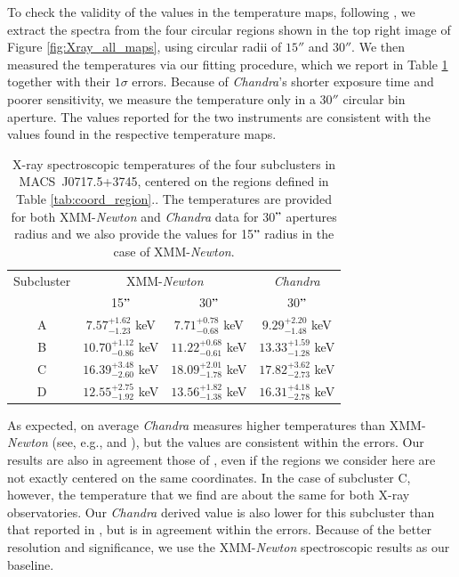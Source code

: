 \documentclass[twocolumn,traditabstract]{aa}
\begin{document}
To check the validity of the values in the temperature maps, following \cite{wang2016}, we extract the spectra from the four circular regions shown in the top right image of Figure  \ref{fig:Xray_all_maps}, using circular radii of $15''$ and $30''$. We then measured the temperatures via our fitting procedure, which we report in Table \ref{tab:subcluster_Tx_measurements} together with their $1\sigma$ errors. Because of \textit{Chandra}'s shorter exposure time and poorer sensitivity, we measure the temperature only in a $30''$ circular bin aperture. The values reported for the two instruments are consistent with the values found in the respective temperature maps.
\begin{table}[h]
\caption{{\footnotesize X-ray spectroscopic temperatures of the four subclusters in \mbox{MACS~J0717.5+3745}, centered on the regions defined in Table \ref{tab:coord_region}.}. The temperatures are provided for both XMM-\textit{Newton} and \textit{Chandra} data for 30$"$ apertures radius and we also provide the values for 15$"$ radius in the case of XMM-\textit{Newton}.}
\begin{center}
\begin{tabular}{cccc}
\hline
\hline
Subcluster & \multicolumn{2}{c}{XMM-\textit{Newton}} & \textit{Chandra} \\
 & 15$"$ & 30$"$ & 30$"$ \\
\hline
A & $  7.57^{+1.62}_{-1.23}$ keV & $  7.71^{+0.78}_{-0.68}$ keV & $  9.29^{+2.20}_{-1.48}$ keV \\
B & $10.70^{+1.12}_{-0.86}$ keV & $11.22^{+0.68}_{-0.61}$ keV & $13.33^{+1.59}_{-1.28}$ keV \\
C & $16.39^{+3.48}_{-2.60}$ keV & $18.09^{+2.01}_{-1.78}$ keV & $17.82^{+3.62}_{-2.73}$ keV \\
D & $12.55^{+2.75}_{-1.92}$ keV & $13.56^{+1.82}_{-1.38}$ keV & $16.31^{+4.18}_{-2.78}$ keV \\
\hline
\end{tabular}
\end{center}
\label{tab:subcluster_Tx_measurements}
\end{table}
As expected, on average \textit{Chandra} measures higher temperatures than XMM-\textit{Newton} (see, e.g., \citealt{martino2014} and \citealt{schellenberger2015}), but the values are consistent within the errors. Our results are also in agreement those of \cite{Sayers2013}, even if the regions we consider here are not exactly centered on the same coordinates. In the case of subcluster C, however, the temperature that we find are about the same for both X-ray observatories. Our \textit{Chandra} derived value is also lower for this subcluster than that reported in \cite{Sayers2013}, but is in agreement within the errors. Because of the better resolution and significance, we use the XMM-\textit{Newton} spectroscopic results as our baseline.
\end{document}
